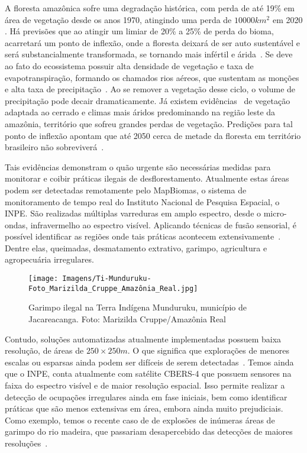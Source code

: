 A floresta amazônica sofre uma degradação histórica, com perda de até 19\% em área de vegetação desde os anos 1970, atingindo uma perda de $10000km^2$ em 2020 \cite{ignacioNature}. Há previsões que ao atingir um limiar de 20\% a 25\% de perda do bioma, acarretará um ponto de inflexão, onde a floresta deixará de ser auto sustentável e será substancialmente transformada, se tornando mais infértil e árida~\cite{LovejoyTipping}. Se deve ao fato do ecossistema possuir alta densidade de vegetação e  taxa de evapotranspiração, formando os chamados rios aéreos, que sustentam as monções e alta taxa de precipitação~\cite{satyamurty2013moisture}. Ao se remover a vegetação desse ciclo, o volume de  precipitação pode decair dramaticamente. Já existem evidências~\cite{ignacioNature} de vegetação adaptada ao cerrado e climas mais áridos predominando na região leste da amazônia, território que sofreu grandes perdas de vegetação. Predições para tal ponto de inflexão apontam que até 2050 cerca de metade da floresta em território brasileiro não sobreviverá~\cite{LovejoyTipping}.

Tais evidências demonstram o quão urgente são necessárias medidas para monitorar e coibir práticas ilegais de desflorestamento. Atualmente estas áreas podem ser detectadas remotamente pelo MapBiomas, o sistema de monitoramento de tempo real do Instituto Nacional de Pesquisa Espacial, o INPE. São realizadas múltiplas varreduras em amplo espectro, desde o micro-ondas, infravermelho ao espectro visível. Aplicando técnicas de fusão sensorial, é possível identificar as regiões onde tais práticas acontecem extensivamente~\cite{inpe_deter}. Dentre elas, queimadas, desmatamento extrativo, garimpo, agricultura e agropecuária irregulares.
\begin{figure}[!ht]
 \centering
 \texttt{[image: Imagens/Ti-Munduruku-Foto\_Marizilda\_Cruppe\_Amazônia\_Real.jpg]}
 \caption{Garimpo ilegal na Terra Indígena Munduruku, município de Jacareacanga.
 Foto: Marizilda Cruppe/Amazônia Real}
\label{fig:garimpo}
\end{figure}
Contudo, soluções automatizadas atualmente implementadas possuem baixa resolução, de áreas de \(250\times250m\). O que significa que explorações de menores escalas ou esparsas ainda podem ser difíceis de serem detectadas~\cite{mapbiomasgarimpo}. Temos ainda que o INPE, conta atualmente com satélite CBERS-4 que possuem sensores na faixa do espectro visível e de maior resolução espacial. Isso permite realizar a detecção de ocupações irregulares ainda em fase iniciais, bem como identificar práticas que são menos extensivas em área, embora ainda muito prejudiciais. Como exemplo, temos o recente caso de de explosões de inúmeras áreas de garimpo do rio madeira, que passariam desapercebido das detecções de maiores resoluções~\cite{mapbiomasgarimpo}.


